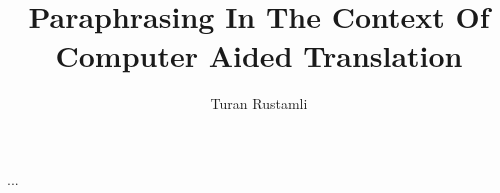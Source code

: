 \documentclass[msc,ai,logo,sansheadings]{infthesis}
\title{Paraphrasing In The Context Of \\ Computer Aided Translation}
\author{Turan Rustamli}
\begin{document}
\begin{preliminary}

\maketitle

\begin{acknowledgements}
...
\end{acknowledgements}

\standarddeclaration


\tableofcontents


\end{preliminary}









\appendix






\end{document}
